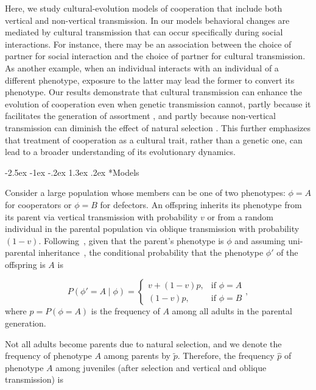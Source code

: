 \documentclass[12pt]{extarticle}
\makeatletter
\renewcommand\section{\@startsection {section}{1}{\z@}%
     {-2.5ex \@plus -1ex \@minus -.2ex}%
     {1.3ex \@plus.2ex}%
    {\Large\bfseries}}
\makeatother
\begin{document}
Here, we study cultural-evolution models of cooperation that include both vertical and non-vertical transmission. 
In our models behavioral changes are mediated by cultural transmission that can occur specifically during social interactions.
For instance, there may be an association between the choice of partner for social interaction and the choice of partner for cultural transmission.
As another example, when an individual interacts with an individual of a different phenotype,  exposure to the latter may lead the former to  convert its phenotype.
Our results demonstrate that cultural transmission can enhance the evolution of cooperation even when genetic transmission cannot, partly because it facilitates the generation of assortment \citep{Fletcher2009assortment}, and partly because non-vertical transmission can diminish the effect of natural selection \citep{ram2018evolution}.
This further emphasizes that treatment of cooperation as a cultural trait, rather than a genetic one, can lead to a broader understanding of its evolutionary dynamics.


\section*{Models}

Consider a large population whose members can be one of two phenotypes: $\phi=A$ for cooperators or $\phi=B$ for defectors.
An offspring inherits its phenotype from its parent via vertical transmission with probability $v$ or from a random individual in the parental population via oblique transmission with probability $(1-v)$. 
Following~\citet{ram2018evolution}, given that the parent's phenotype is $\phi$ and assuming uni-parental inheritance~\citep{Zefferman2016}, the conditional probability that the phenotype $\phi'$ of the offspring is $A$ is 

\begin{equation} \label{eq:vertical_oblique_transmission}
P(\phi'=A \mid \phi) = \begin{cases}
v + (1-v)p, & \text{if } \phi=A \\
(1-v)p, & \text{if } \phi=B
\end{cases},
\end{equation}
where $p=P(\phi=A)$ is the frequency of $A$ among all adults in the parental generation.  

Not all adults become parents due to natural selection, and we denote the frequency of phenotype $A$ among parents by $\tilde{p}$.
Therefore, the frequency $\hat{p}$ of  phenotype $A$ among juveniles (after selection and vertical and oblique transmission) is
\end{document}
